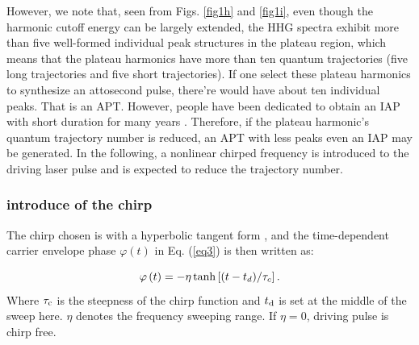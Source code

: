 \documentclass[10pt,letterpaper]{article}
\begin{document}
However, we note that, seen from Figs. \ref{fig1h} and \ref{fig1i}, even though the harmonic cutoff energy can be largely extended, the HHG spectra exhibit more than five well-formed individual peak structures in the plateau region, which means that the plateau harmonics have more than ten quantum trajectories (five long trajectories and five short trajectories). If one select these plateau harmonics to synthesize an attosecond pulse, there're would have about ten individual peaks. That is an APT. However, people have been dedicated to obtain an IAP with short duration for many years \cite{IAP-reference1-1998,Sansone-Polarization-gate-Nature-2006,IAP-reference2-2008,IAP-reference3-2008,IAP-reference4-2012}. Therefore, if the plateau harmonic's quantum trajectory number is reduced, an APT with less peaks even an IAP may be generated. In the following, a nonlinear chirped frequency is introduced to the driving laser pulse and is expected to reduce the trajectory number. 
\subsubsection{introduce of the chirp}

The chirp chosen is with a hyperbolic tangent form \cite{Carrera-Chirp-PRA-2007}, and the time-dependent carrier envelope phase $ \varphi(t) $ in Eq. (\ref{eq3}) is then written as:

\begin{equation}
\varphi \left( t \right) =  - \eta \tanh \left[ {{{\left( {t - {t_d}} \right)} \mathord{\left/
			{\vphantom {{\left( {t - {t_d}} \right)} {{\tau _c}}}} \right.
			\kern-\nulldelimiterspace} {{\tau _c}}}} \right].
\label{eq17}
\end{equation}
Where $ \tau_{\rm{c}} $ is the steepness of the chirp function and $ t_{\rm{d}} $ is set at the middle of the sweep here. $ \eta $  denotes the frequency sweeping range. If $ \eta=0 $, driving pulse is chirp free. 
\end{document}

